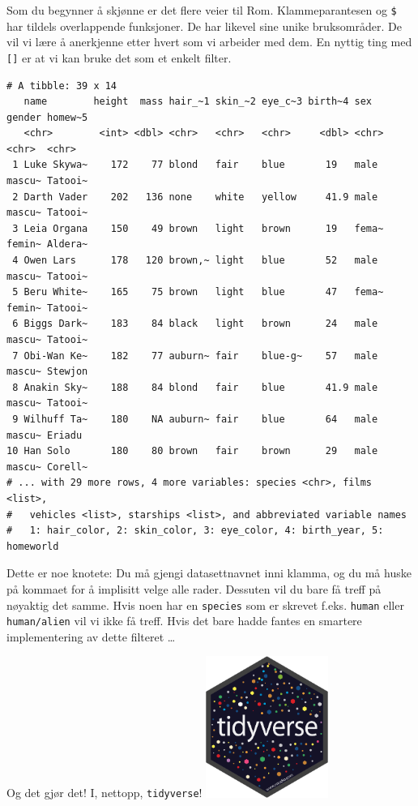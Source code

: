 \documentclass[
  letterpaper,
  DIV=11,
  numbers=noendperiod]{scrartcl}
\newenvironment{Shaded}{\begin{snugshade}}{\end{snugshade}}
\newcommand{\CommentTok}[1]{\textcolor[rgb]{0.37,0.37,0.37}{#1}}
\newcommand{\NormalTok}[1]{\textcolor[rgb]{0.00,0.23,0.31}{#1}}
\newcommand{\SpecialCharTok}[1]{\textcolor[rgb]{0.37,0.37,0.37}{#1}}
\newcommand{\StringTok}[1]{\textcolor[rgb]{0.13,0.47,0.30}{#1}}
\begin{document}
Som du begynner å skjønne er det flere veier til Rom. Klammeparantesen
og \texttt{\$} har tildels overlappende funksjoner. De har likevel sine
unike bruksområder. De vil vi lære å anerkjenne etter hvert som vi
arbeider med dem. En nyttig ting med \texttt{{[}{]}} er at vi kan bruke
det som et enkelt filter.

\begin{Shaded}
\end{Shaded}

\begin{verbatim}
# A tibble: 39 x 14
   name        height  mass hair_~1 skin_~2 eye_c~3 birth~4 sex   gender homew~5
   <chr>        <int> <dbl> <chr>   <chr>   <chr>     <dbl> <chr> <chr>  <chr>  
 1 Luke Skywa~    172    77 blond   fair    blue       19   male  mascu~ Tatooi~
 2 Darth Vader    202   136 none    white   yellow     41.9 male  mascu~ Tatooi~
 3 Leia Organa    150    49 brown   light   brown      19   fema~ femin~ Aldera~
 4 Owen Lars      178   120 brown,~ light   blue       52   male  mascu~ Tatooi~
 5 Beru White~    165    75 brown   light   blue       47   fema~ femin~ Tatooi~
 6 Biggs Dark~    183    84 black   light   brown      24   male  mascu~ Tatooi~
 7 Obi-Wan Ke~    182    77 auburn~ fair    blue-g~    57   male  mascu~ Stewjon
 8 Anakin Sky~    188    84 blond   fair    blue       41.9 male  mascu~ Tatooi~
 9 Wilhuff Ta~    180    NA auburn~ fair    blue       64   male  mascu~ Eriadu 
10 Han Solo       180    80 brown   fair    brown      29   male  mascu~ Corell~
# ... with 29 more rows, 4 more variables: species <chr>, films <list>,
#   vehicles <list>, starships <list>, and abbreviated variable names
#   1: hair_color, 2: skin_color, 3: eye_color, 4: birth_year, 5: homeworld
\end{verbatim}

Dette er noe knotete: Du må gjengi datasettnavnet inni klamma, og du må
huske på kommaet for å implisitt velge alle rader. Dessuten vil du bare
få treff på nøyaktig det samme. Hvis noen har en \texttt{species} som er
skrevet f.eks. \texttt{human} eller \texttt{human/alien} vil vi ikke få
treff. Hvis det bare hadde fantes en smartere implementering av dette
filteret \ldots{}

Og det gjør det! I, nettopp, \texttt{tidyverse}!
\includegraphics[width=0.3\textwidth,height=\textheight]{img/tidyverse-logo.png}
\end{document}
